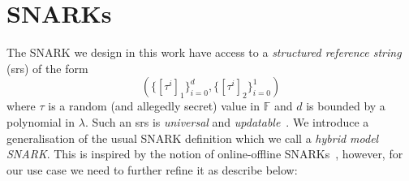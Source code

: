 \section{SNARKs}
\label{sec:snarks_defs}
\vspace{-0.02in}
\noindent The SNARK we design in this work have access to a \emph{structured reference string} (srs) of the form 
$$(\{[\tau^i]_1\}_{i=0}^{d}, \{[\tau^i]_2\}_{i=0}^{1})$$ where $\tau$ is a random (and allegedly secret) value in $\mathbb{F}$ and $d$ 
is bounded by a polynomial in $\lambda$. Such an srs is \emph{universal} and \emph{updatable}~\cite{updatable_universal_srs_2018}. 
We introduce a generalisation of the usual SNARK definition which we call a \emph{hybrid model SNARK}. This is inspired by the notion of online-offline SNARKs~\cite{HP_paper}, 
however, for our use case we need to further refine it as describe below:                                      
